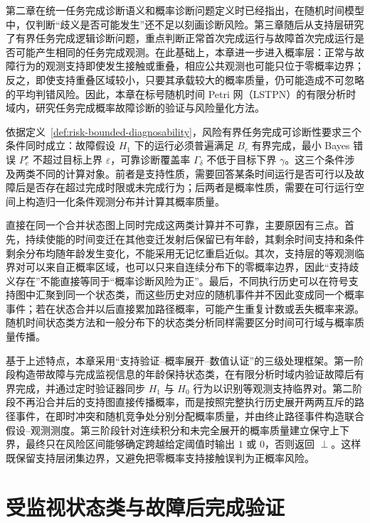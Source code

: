 \documentclass[master,fontset=ubuntu]{shnuthesis}
\DeclareRobustCommand{\probstatus}[1]{\ensuremath{#1}}
\theoremstyle{definition}
\begin{document}
第二章在统一任务完成诊断语义和概率诊断问题定义时已经指出，在随机时间模型中，仅判断“歧义是否可能发生”还不足以刻画诊断风险。第三章随后从支持层研究了有界任务完成逻辑诊断问题，重点判断正常首次完成运行与故障首次完成运行是否可能产生相同的任务完成观测。在此基础上，本章进一步进入概率层：正常与故障行为的观测支持即使发生接触或重叠，相应公共观测也可能只位于零概率边界；反之，即使支持重叠区域较小，只要其承载较大的概率质量，仍可能造成不可忽略的平均判错风险。因此，本章在标号随机时间 Petri 网（LSTPN）的有限分析时域内，研究任务完成概率故障诊断的验证与风险量化方法。

依据定义~\ref{def:risk-bounded-diagnosability}，风险有界任务完成可诊断性要求三个条件同时成立：故障假设 \(H_1\) 下的运行必须普遍满足 \(B_c\) 有界完成，最小 Bayes 错误 \(P_e^\star\) 不超过目标上界 \(\varepsilon\)，可靠诊断覆盖率 \(\Gamma_\delta\) 不低于目标下界 \(\gamma\)。这三个条件涉及两类不同的计算对象。前者是支持性质，需要回答某条时间运行是否可行以及故障后是否存在超过完成时限或未完成行为；后两者是概率性质，需要在可行运行空间上构造归一化条件观测分布并计算其概率质量。

直接在同一个合并状态图上同时完成这两类计算并不可靠，主要原因有三点。首先，持续使能的时间变迁在其他变迁发射后保留已有年龄，其剩余时间支持和条件剩余分布均随年龄发生变化，不能采用无记忆重启近似。其次，支持层的等观测临界对可以来自正概率区域，也可以只来自连续分布下的零概率边界，因此“支持歧义存在”不能直接等同于“概率诊断风险为正”。最后，不同执行历史可以在符号支持图中汇聚到同一个状态类，而这些历史对应的随机事件并不因此变成同一个概率事件；若在状态合并以后直接累加路径概率，可能产生重复计数或丢失概率来源。随机时间状态类方法和一般分布下的状态类分析同样需要区分时间可行域与概率质量传播\cite{Carnevali2009,Vicario2009,Lefebvre2023}。

基于上述特点，本章采用“支持验证--概率展开--数值认证”的三级处理框架。第一阶段构造带故障与完成监视信息的年龄保持状态类，在有限分析时域内验证故障后有界完成，并通过定时验证器同步 \(H_1\) 与 \(H_0\) 行为以识别等观测支持临界对。第二阶段不再沿合并后的支持图直接传播概率，而是按照完整执行历史展开两两互斥的路径事件，在即时冲突和随机竞争处分别分配概率质量，并由终止路径事件构造联合假设--观测测度。第三阶段针对连续积分和未完全展开的概率质量建立保守上下界，最终只在风险区间能够确定跨越给定阈值时输出 \probstatus{1} 或 \probstatus{0}，否则返回 \probstatus{\perp}。这样既保留支持层闭集边界，又避免把零概率支持接触误判为正概率风险。

\section{受监视状态类与故障后完成验证}
\end{document}
